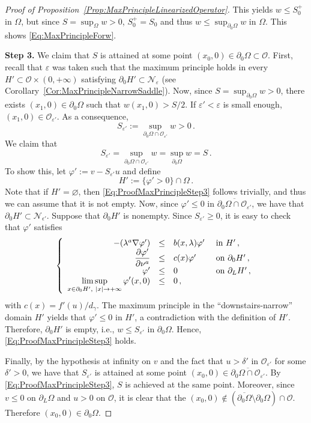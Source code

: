\documentclass[12pt,reqno]{amsart}
\theoremstyle{definition}
\theoremstyle{remark}
\newcommand{\ncal}{\mathcal{N}}
\newcommand{\ocal}{\mathcal{O}}
\newcommand{\s}{\gamma}
\newcommand\beqc[1]{\left\{\begin{array}{#1}}
\newcommand\eeqc{\end{array} \right.}
\def\PDEsystem{rcll}
\let\div\relax
\DeclareMathOperator{\div}{div}
\def\ds{\displaystyle}
\numberwithin{equation}{section}
\begin{document}
\begin{proof}[Proof of Proposition~\ref{Prop:MaxPrincipleLinearizedOperator}]
This yields $w\leq S_0^+$ in $\Omega$, but since $S = \sup_{\Omega} w > 0$, $S_0^+ = S_0$ and thus $w\leq \sup_{\partial_0\Omega} w$ in $\Omega$. This shows \eqref{Eq:MaxPrincipleForw}.


\textbf{Step 3.}
We claim that $S$ is attained at some point $(x_0, 0) \in \partial_0 \Omega\subset \ocal$. First, recall that $\varepsilon$ was taken such that the maximum principle holds in every $H'\subset \ocal \times (0,+\infty)$ satisfying $\partial_0 H' \subset \ncal_{\varepsilon}$ (see Corollary~\ref{Cor:MaxPrincipleNarrowSaddle}). Now, since $S=\sup_{\partial_0 \Omega } w >0$, there exists $(x_1,0)\in \partial_0\Omega$ such that $w(x_1,0)>S/2$. If $\varepsilon'<\varepsilon$ is small enough, $(x_1,0)\in \ocal_{\varepsilon'}$. As a consequence,
$$
S_{\varepsilon'} :=\sup_{\partial_0 \Omega \cap \ocal_{\varepsilon'}} w > 0\,.
$$
We claim that
\begin{equation}
\label{Eq:ProofMaxPrincipleStep3}
S_{\varepsilon'} =\sup_{\partial_0 \Omega \cap \ocal_{\varepsilon'}} w =\sup_{\partial_0 \Omega } w = S\,.
\end{equation}
To show this, let $\varphi' := v - S_{\varepsilon'}u$ and define 
$$
H' := \{\varphi' > 0\}\cap \Omega\,.
$$
Note that if $H'=\varnothing$,  then \eqref{Eq:ProofMaxPrincipleStep3} follows trivially, and thus we can assume that it is not empty. Now, since $\varphi' \leq 0$ in $\overline{\partial_0 \Omega \cap \ocal_{\varepsilon'}}$, we have that $\partial_0 H' \subset \ncal_{\epsilon'}$. Suppose that $\partial_0H'$ is nonempty. Since $S_{\varepsilon'}\geq 0$, it is easy to check that $\varphi'$ satisfies
$$
\beqc{\PDEsystem}
-\div(\lambda^a \nabla \varphi') &\leq& b(x,\lambda)\varphi' & \text{ in } H' \,, \\
\dfrac{\partial \varphi'}{\partial \nu^a}  &\leq & c(x) \varphi' & \text{ on } \partial_0 H' \,, \\
\varphi' & \leq & 0 & \text{ on } \partial_L H'  \,,\\
\ds \limsup_{x \in \partial_0 H',\ |x|\to +\infty} \varphi'(x,0) & \leq & 0\,,
\eeqc
$$
with $c(x) = f'(u) / d_\s$. The maximum principle in the ``downstairs-narrow'' domain $H'$ yields that $\varphi' \leq 0$ in $H'$, a contradiction with the definition of $H'$. Therefore, $\partial_0H'$ is empty, i.e., $w\leq S_{\varepsilon'}$ in $\partial_0 \Omega$. Hence, \eqref{Eq:ProofMaxPrincipleStep3} holds. 


Finally, by the hypothesis at infinity on $v$ and the fact that $u>\delta'$ in $\ocal_{\varepsilon'}$ for some $\delta'>0$, we have that $S_{\varepsilon'}$ is attained at some point $(x_0,0) \in \overline{\partial_0 \Omega \cap \ocal_{\varepsilon'}}$. By \eqref{Eq:ProofMaxPrincipleStep3}, $S$ is achieved at the same point. Moreover, since $v\leq 0$ on $\partial_L\Omega$ and $u>0$ on $\ocal$, it is clear that the $(x_0,0) \notin (\overline{\partial_0\Omega} \setminus \partial_0 \Omega)\cap \ocal$. Therefore $(x_0,0)\in\partial_0\Omega$.


\end{proof}
\end{document}
